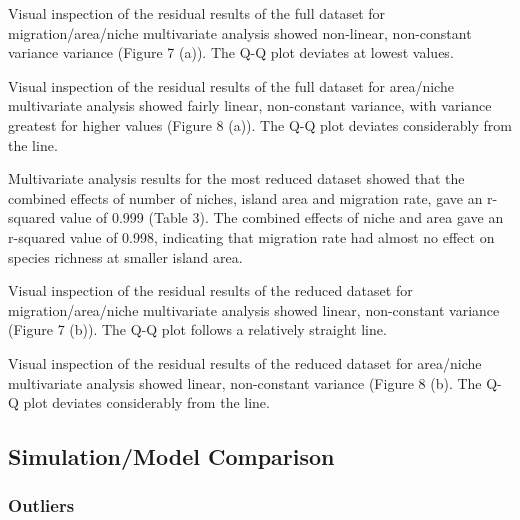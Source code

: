 \documentclass{article}
\begin{document}
\noindent Visual inspection of the residual results of the full dataset for migration/area/niche multivariate analysis showed non-linear, non-constant variance variance (Figure 7 (a)). The Q-Q plot deviates at lowest values. \bigskip

\noindent Visual inspection of the residual results of the full dataset for area/niche multivariate analysis showed fairly linear, non-constant variance, with variance greatest for higher values (Figure 8 (a)). The Q-Q plot deviates considerably from the line. \bigskip

\noindent Multivariate analysis results for the most reduced dataset showed that the combined effects of number of niches, island area and migration rate, gave an r-squared value of 0.999 (Table 3). The combined effects of niche and area gave an r-squared value of 0.998, indicating that migration rate had almost no effect on species richness at smaller island area. \bigskip

\noindent Visual inspection of the residual results of the reduced dataset for migration/area/niche multivariate analysis showed linear, non-constant variance (Figure 7 (b)). The Q-Q plot follows a relatively straight line. \bigskip 

\noindent Visual inspection of the residual results of the reduced dataset for area/niche multivariate analysis showed linear, non-constant variance (Figure 8 (b). The Q-Q plot deviates considerably from the line. 

\subsection{Simulation/Model Comparison}

\subsubsection{Outliers}
\end{document}
